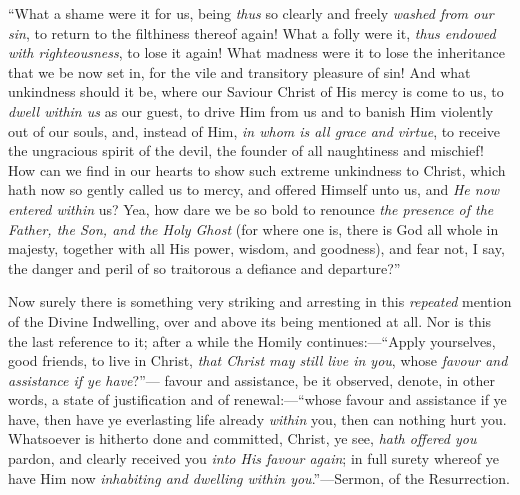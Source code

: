 ``What a shame were it for us, being \emph{thus} so clearly and
freely \emph{washed from our sin}, to return to the filthiness thereof
again! What a folly were it, \emph{thus endowed with righteousness},
to lose it again! What madness were it to lose the inheritance that we
be now set in, for the vile and transitory pleasure of sin! And what
unkindness should it be, where our Saviour Christ of His mercy is come
to us, to \emph{dwell within us} as our guest, to drive Him from us
and to banish Him violently out of our souls, and, instead of Him, \emph{in whom is all grace and virtue}, to receive the ungracious spirit
of the devil, the founder of all naughtiness and mischief! How can we
find in our hearts to show such extreme unkindness to Christ, which
hath now so gently called us to mercy, and offered Himself unto us,
and \emph{He now entered within} us? Yea, how dare we be so bold to
renounce \emph{the presence of the Father, the Son, and the Holy Ghost}
(for where one is, there is God all whole in majesty, together with
all His power, wisdom, and goodness), and fear not, I say, the danger
and peril of so traitorous a defiance and departure?''

Now surely there is something very striking and arresting in this \emph{repeated}
mention of the Divine Indwelling, over and above its being mentioned
at all. Nor is this the last reference to it; after a while the Homily
continues:—``Apply yourselves, good friends, to live in Christ, \emph{that
Christ may still live in you}, whose \emph{favour and assistance if ye
have}?''— favour and assistance, be it observed,
denote, in other words, a state of justification and of renewal:—``whose
favour and assistance if ye have, then have ye everlasting life
already \emph{within} you, then can nothing hurt you. Whatsoever is
hitherto done and committed, Christ, ye see, \emph{hath offered you}
pardon, and clearly received you \emph{into His favour again}; in full
surety whereof ye have Him now \emph{inhabiting and dwelling within you}.''—Sermon,
of the Resurrection.

